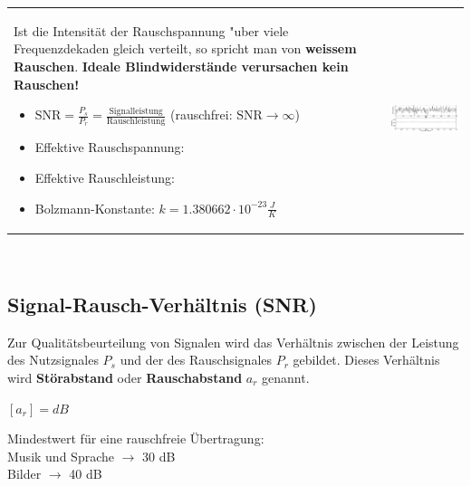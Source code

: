 		\begin{tabularx}{\textwidth}{lX}
			\parbox{9.5cm}{
			Ist die Intensität der
			Rauschspannung "uber viele Frequenzdekaden
			gleich verteilt, so spricht man von \textbf{weissem Rauschen}.\\ \\
			\textbf{Ideale Blindwiderstände verursachen kein Rauschen!}
			\begin{itemize}
     			\item $\text{SNR} = \frac{P_s}{P_r} = \frac{\text{Signalleistung}}{\text{Rauschleistung}}$ (rauschfrei: $ \text{SNR} \rightarrow \infty$) 
     			\item Effektive Rauschspannung: 
     			\item Effektive Rauschleistung: 
     			\item Bolzmann-Konstante: $k =1.380662 \cdot 10^{-23}\frac{J}{K}$
   			\end{itemize}
			}
			&
			\parbox{8cm}{
				\includegraphics[width=8cm]{./bilder/rauschen2.png}
			}
		\end{tabularx}\\
		
	\subsection{Signal-Rausch-Verhältnis (SNR) }
	
		Zur Qualitätsbeurteilung von Signalen wird das Verhältnis zwischen der Leistung des Nutzsignales $P_s$ und der 
		des Rauschsignales $P_r$ gebildet. Dieses Verhältnis wird \textbf{Störabstand} oder \textbf{Rauschabstand} $a_r$ genannt.\\
	
		\begin{minipage}[]{10cm}
			$[a_r] = dB$\\
		\end{minipage}
		\begin{minipage}[]{10cm}		
			Mindestwert für eine rauschfreie Übertragung: \\
			Musik und Sprache $\rightarrow$ 30 dB \\
			Bilder $\rightarrow$ 40 dB
		\end{minipage}
	
